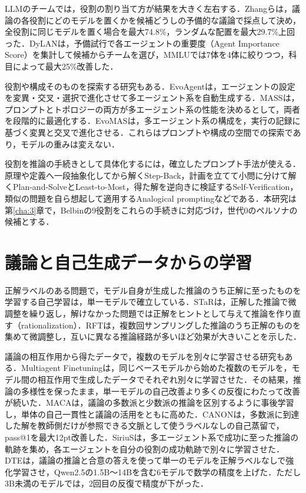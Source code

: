 LLMのチームでは，役割の割り当て方が結果を大きく左右する．Zhangら\cite{zhang2026dynamic}は，議論の各役割にどのモデルを置くかを候補どうしの予備的な議論で採点して決め，全役割に同じモデルを置く場合を最大74.8\%，ランダムな配置を最大29.7\%上回った．DyLAN\cite{liu2024dylan}は，予備試行で各エージェントの重要度（Agent Importance Score）を集計して候補からチームを選び，MMLUでは7体を4体に絞りつつ，科目によって最大25\%改善した．

役割や構成そのものを探索する研究もある．EvoAgent\cite{yuan2025evoagent}は，エージェントの設定を変異・交叉・選択で進化させて多エージェント系を自動生成する．MASS\cite{zhou2026mass}は，プロンプトとトポロジーの両方が多エージェント系の性能を決めるとして，両者を段階的に最適化する．EvoMAS\cite{evomas2026evolving}は，多エージェント系の構成を，実行の記録に基づく変異と交叉で進化させる．これらはプロンプトや構成の空間での探索であり，モデルの重みは変えない．

役割を推論の手続きとして具体化するには，確立したプロンプト手法が使える．原理や定義へ一段抽象化してから解くStep-Back\cite{zheng2024stepback}，計画を立てて小問に分けて解くPlan-and-Solve\cite{wang2023plan}とLeast-to-Most\cite{zhou2023least}，得た解を逆向きに検証するSelf-Verification\cite{weng2023large}，類似の問題を自ら想起して適用するAnalogical prompting\cite{yasunaga2024analogical}などである．本研究は第\ref{cha:3}章で，Belbinの9役割をこれらの手続きに対応づけ，世代0のペルソナの候補とする．

\section{議論と自己生成データからの学習}
\label{sec:2.3}

正解ラベルのある問題で，モデル自身が生成した推論のうち正解に至ったものを学習する自己学習は，単一モデルで確立している．STaR\cite{zelikman2022star}は，正解した推論で微調整を繰り返し，解けなかった問題では正解をヒントとして与えて推論を作り直す（rationalization）．RFT\cite{yuan2023scaling}は，複数回サンプリングした推論のうち正解のものを集めて微調整し，互いに異なる推論経路が多いほど効果が大きいことを示した．

議論の相互作用から得たデータで，複数のモデルを別々に学習させる研究もある．Multiagent Finetuning\cite{subramaniam2025multiagent}は，同じベースモデルから始めた複数のモデルを，モデル間の相互作用で生成したデータでそれぞれ別々に学習させた．その結果，推論の多様性を保ったまま，単一モデルの自己改善より多くの反復にわたって改善が続いた．MACA\cite{maca2025preference}は，議論の多数派と少数派の推論を区別するように事後学習し，単体の自己一貫性と議論の活用をともに高めた．CANON\cite{gkountouras2026canon}は，多数派に到達した解を教師側だけが参照できる文脈として使うラベルなしの自己蒸留で，pass@1を最大12pt改善した．SiriuS\cite{zhao2025sirius}は，多エージェント系で成功に至った推論の軌跡を集め，各エージェントを自分の役割の成功軌跡で別々に学習させた．DTE\cite{srivastava2025dte}は，議論の推論と合意の答えを使って単一のモデルを正解ラベルなしで強化学習させ，Qwen2.5の1.5B〜14Bを含む6モデルで数学の精度を上げた．ただし3B未満のモデルでは，2回目の反復で精度が下がった．

